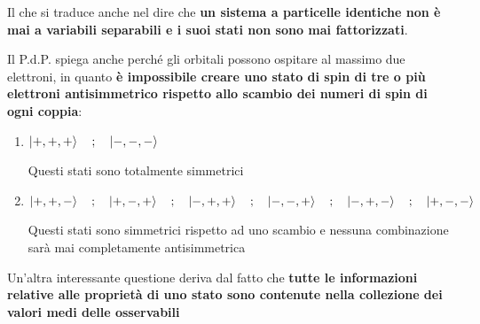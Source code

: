 Il che si traduce anche nel dire che \textbf{un sistema a particelle identiche non è mai a variabili separabili e i suoi stati non sono mai fattorizzati}.

Il P.d.P. spiega anche perché gli orbitali possono ospitare al massimo due elettroni, in quanto \textbf{è impossibile creare uno stato di spin di tre o più elettroni antisimmetrico rispetto allo scambio dei numeri di spin di ogni coppia}:

\begin{enumerate}
	\item $\ket{+,+,+} \quad;\quad \ket{-,-,-}$
	
	Questi stati sono totalmente simmetrici
	
	\item $\ket{+,+,-} \quad;\quad \ket{+,-,+} \quad;\quad \ket{-,+,+}\quad;\quad \ket{-,-,+}\quad;\quad \ket{-,+,-}\quad;\quad \ket{+,-,-}$
	
	Questi stati sono simmetrici rispetto ad uno scambio e nessuna combinazione sarà mai completamente antisimmetrica
\end{enumerate}

Un'altra interessante questione deriva dal fatto che \textbf{tutte le informazioni relative alle proprietà di uno stato sono contenute nella collezione dei valori medi delle osservabili}

